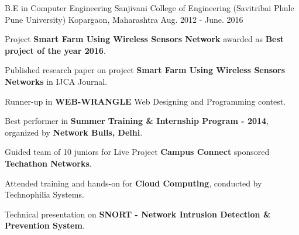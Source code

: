 

\begin{cventries}

  \cventry
    {B.E in Computer Engineering} %
    {Sanjivani College of Engineering (Savitribai Phule Pune University)} %
    {Kopargaon, Maharashtra} %
    {Aug. 2012 - June. 2016} %
    {
      \begin{cvitems} %
      	\item {Project \textbf{Smart Farm Using Wireless Sensors Network} awarded as \textbf{Best project of the year 2016}.}
        \item {Published research paper on project \textbf{Smart Farm Using Wireless Sensors Networks} in IJCA Journal.}  
        \item {Runner-up in \textbf{WEB-WRANGLE} Web Designing and Programming contest.}
        \item {Best performer in \textbf{Summer Training \& Internship Program - 2014}, organized by \textbf{Network Bulls, Delhi}.}
        \item {Guided team of 10 juniors for Live Project \textbf{Campus Connect} sponsored \textbf{Techathon Networks}.}
        \item {Attended training and hands-on for \textbf{Cloud Computing}, conducted by Technophilia Systems.}      
		\item {Technical presentation on \textbf{SNORT - Network Intrusion Detection \& Prevention System}.}         
      \end{cvitems}
    }

\end{cventries}

